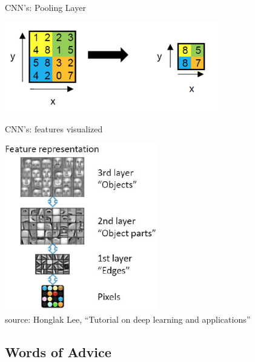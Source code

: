\documentclass{beamer}
\begin{document}
\begin{frame}{CNN's: Pooling Layer}
\begin{center}
\includegraphics[width=0.7\textwidth]{pooling}
\end{center}
\begin{itemize}
\end{itemize}
\end{frame}

\begin{frame}{CNN's: features visualized}
\begin{center}
\includegraphics[width=0.5\textwidth]{cnn_features}\\
source: Honglak Lee, “Tutorial on deep learning and applications”
\end{center}
\end{frame}

\subsection{Words of Advice}
\end{document}
